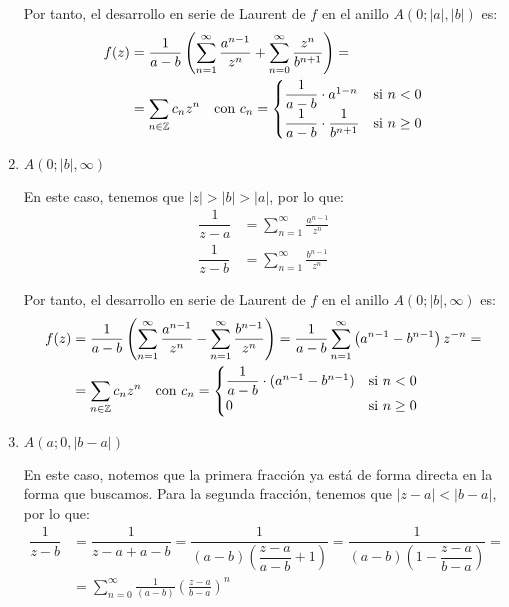 \begin{ejercicio}
\begin{enumerate}
        Por tanto, el desarrollo en serie de Laurent de $f$ en el anillo $A(0; |a|, |b|)$ es:
        \begin{align*}
            f(z) &= \dfrac{1}{a - b} \left( \sum_{n=1}^{\infty} \frac{a^{n-1}}{z^n} + \sum_{n=0}^{\infty} \frac{z^n}{b^{n+1}} \right) =\\&= \sum_{n\in \mathbb{Z}} c_n z^n
            \quad \text{con } c_n = \begin{cases}
                \dfrac{1}{a - b} \cdot a^{1-n} & \text{si } n < 0\\
                \dfrac{1}{a - b} \cdot \dfrac{1}{b^{n+1}} & \text{si } n \geq 0
            \end{cases}
        \end{align*}

        \item $A(0; |b|, \infty)$
        
        En este caso, tenemos que $|z| > |b|>|a|$, por lo que:
        \begin{align*}
            \dfrac{1}{z-a} &= \sum_{n=1}^{\infty} \frac{a^{n-1}}{z^n}\\
            \dfrac{1}{z-b} &= \sum_{n=1}^{\infty} \frac{b^{n-1}}{z^n}
        \end{align*}

        Por tanto, el desarrollo en serie de Laurent de $f$ en el anillo $A(0; |b|, \infty)$ es:
        \begin{align*}
            f(z) &= \dfrac{1}{a - b} \left( \sum_{n=1}^{\infty} \frac{a^{n-1}}{z^n} - \sum_{n=1}^{\infty} \frac{b^{n-1}}{z^n} \right)
            = \dfrac{1}{a - b} \sum_{n=1}^{\infty} \left( a^{n-1} - b^{n-1} \right) z^{-n}
            =\\&= \sum_{n\in \mathbb{Z}} c_n z^n
            \quad \text{con } c_n = \begin{cases}
                \dfrac{1}{a - b} \cdot (a^{n-1} - b^{n-1}) & \text{si } n < 0\\
                0 & \text{si } n\geq 0
            \end{cases}
        \end{align*}
        \item $A(a; 0, |b - a|)$
        
        En este caso, notemos que la primera fracción ya está de forma directa en la forma que buscamos. Para la segunda fracción, tenemos que $|z - a| < |b - a|$, por lo que:
        \begin{align*}
            \dfrac{1}{z-b} &= \dfrac{1}{z-a+a-b}
            = \dfrac{1}{(a-b)\left(\dfrac{z-a}{a-b} + 1\right)}
            = \dfrac{1}{(a-b)\left(1-\dfrac{z-a}{b-a}\right)}
            =\\&= \sum_{n=0}^{\infty} \frac{1}{(a-b)} \left(\frac{z-a}{b-a}\right)^n
        \end{align*}


\end{enumerate}
\end{ejercicio}
